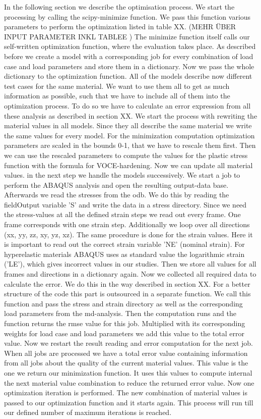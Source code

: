     In the following section we describe the optimisation process. We start the processing by calling the scipy-minimize function. We pass this function various parameters to perform the optimization listed in table XX. (MEHR ÜBER INPUT PARAMETER INKL TABLEE ) The minimize function itself calls our self-written optimization function, where the evaluation takes place. As described before we create a model with a corresponding job for every combination of load case and load parameters and store them in a dictionary. Now we pass the whole dictionary to the optimization function. All of the models describe now different test cases for the same material. We want to use them all to get as much information as possible, such that we have to include all of them into the optimization process. To do so we have to calculate an error expression from all these analysis as described in section XX. 
    We start the process with rewriting the material values in all models. Since they all describe the same material we write the same values for every model. For the minimization computation optimization parameters are scaled in the bounds 0-1, that we have to rescale them first. Then we can use the rescaled parameters to compute the values for the plastic stress function with the formula for VOCE-hardening. Now we can update all material values. in the next step we handle the models successively. We start a job to perform the ABAQUS analysis and open the resulting output-data base. Afterwards we read the stresses from the odb. We do this by reading the fieldOutput variable 'S' and write the data in a stress directory. Since we need the stress-values at all the defined strain steps we read out every frame. One frame corresponds with one strain step. Additionally we loop over all directions (xx, yy, zz, xy, yz, xz). The same procedure is done for the strain values. Here it is important to read out the correct strain variable 'NE' (nominal strain). For hyperelastic materials ABAQUS uses as standard value the logarithmic strain ('LE'), which gives incorrect values in our studies. Then we store all values for all frames and directions in a dictionary again. Now we collected all required data to calculate the error. We do this in the way described in section XX. For a better structure of the code this part is outsourced in a separate function. We call this function and pass the stress and strain directory as well as the corresponding load parameters from the md-analysis. Then the computation runs and the function returns the rmse value for this job. Multiplied with its corresponding weights for load case and load parameters we add this value to the total error value. Now we restart the result reading and error computation for the next job. When all jobs are processed we have a total error value containing information from all jobs about the quality of the current material values. This value is the one we return our minimization function. It uses this values to compute internal the next material value combination to reduce the returned error value. Now one optimization iteration is performed. The new combination of material values is passed to our optimization function and it starts again. This process will run till our defined number of maximum iterations is reached. 

